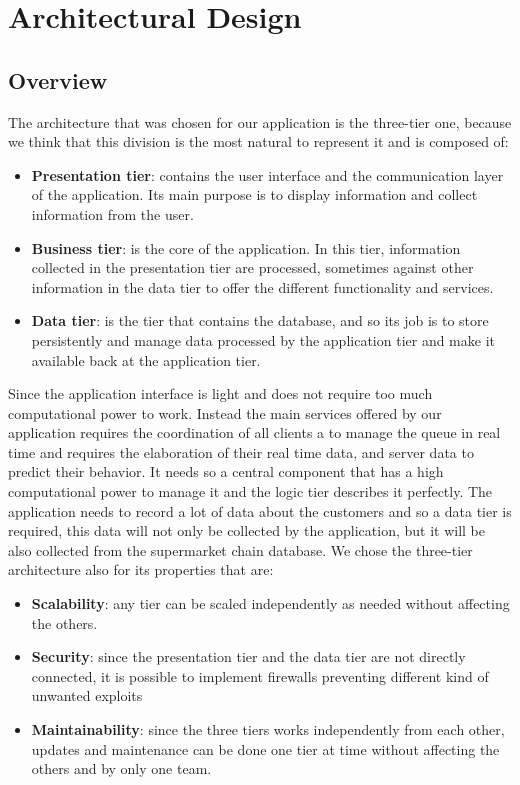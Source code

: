 \chapter{Architectural Design}

\section{Overview}
The architecture that was chosen for our application is the three-tier one, because we think that this division is the most natural to represent it and is composed of: 
\begin{itemize}
	\item \textbf{Presentation tier}: contains the user interface and the communication layer of the application. Its main purpose is to display information and collect information from the user.

	\item \textbf{Business tier}: is the core of the application. In this tier, information collected in the presentation tier are processed, sometimes against other information in the data tier to offer the different functionality and services.

	\item \textbf{Data tier}: is the tier that contains the database, and so its job is to store persistently and manage data processed by the application tier and 	make it available back at the application tier.
\end{itemize}
Since the application interface is light and does not require too much computational power to work.
Instead the main services offered by our application requires the coordination of all clients a to manage the queue in real time and requires the elaboration of their real time data, and server data to predict their behavior. It needs so a central component that has a high computational power to manage it and the logic tier describes it perfectly. The application needs to record a lot of data about the customers and so a data tier is required, this data will not only be collected by the application, but it will be also collected from the supermarket chain database.
We chose the three-tier architecture also for its properties that are:
\begin{itemize}
	\item \textbf{Scalability}: any tier can be scaled independently as needed without affecting the others.

	\item \textbf{Security}: since the presentation tier and the data tier are not directly connected, it is possible to implement firewalls preventing different 			kind of unwanted exploits

	\item \textbf{Maintainability}: since the three tiers works independently from each other, updates and maintenance can be done one tier at time without 			affecting the others and by only one team. 
\end{itemize}
